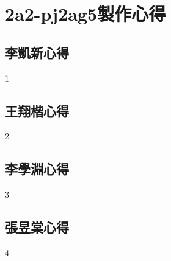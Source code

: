 \chapter{2a2-pj2ag5製作心得}
\section{李凱新心得}
1
\section{王翔楷心得}
2
\section{李學淵心得}
3
\section{張昱棠心得}
4
\newpage